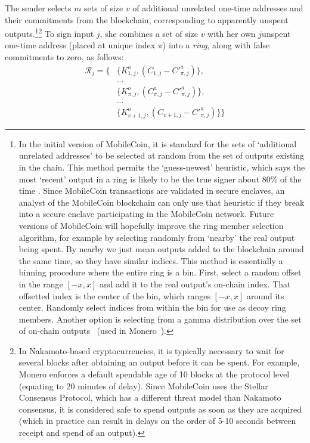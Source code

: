 The sender selects $m$ sets of size $v$ of additional unrelated one-time addresses and their commitments from the blockchain, corresponding to apparently unspent outputs.\footnote{\label{input-selection}In the initial version of MobileCoin, it is standard for the sets of `additional unrelated addresses' to be selected at random from the set of outputs existing in the chain. This method permits the `guess-newest' heuristic, which says the most `recent' output in a ring is likely to be the true signer about 80\% of the time \cite{AnalysisOfLinkability}. Since MobileCoin transactions are validated in secure enclaves, an analyst of the MobileCoin blockchain can only use that heuristic if they break into a secure enclave participating in the MobileCoin network. Future versions of MobileCoin will hopefully improve the ring member selection algorithm, for example by selecting randomly from `nearby' the real output being spent. By nearby we just mean outputs added to the blockchain around the same time, so they have similar indices. This method is essentially a binning procedure where the entire ring is a bin. First, select a random offset in the range $[-x, x]$ and add it to the real output's on-chain index. That offsetted index is the center of the bin, which ranges $[-x, x]$ around its center. Randomly select indices from within the bin for use as decoy ring members. Another option is selecting from a gamma distribution over the set of on-chain outputs~\cite{AnalysisOfLinkability} (used in Monero~\cite{ztm-2}).}\footnote{In Nakamoto-based cryptocurrencies, it is typically necessary to wait for several blocks after obtaining an output before it can be spent. For example, Monero enforces a default spendable age of 10 blocks at the protocol level~\cite{ztm-2} (equating to 20 minutes of delay). Since MobileCoin uses the Stellar Consensus Protocol, which has a different threat model than Nakamoto consensus, it is considered safe to spend outputs as soon as they are acquired (which in practice can result in delays on the order of 5-10 seconds between receipt and spend of an output).} To sign input $j$, she combines a set of size $v$ with her own $j$\nth unspent one-time address (placed at unique index $\pi$) into a {\em ring}, along with false commitments to zero, as follows:\vspace{.175cm}
\begin{align*}
    \mathcal{R}_j = \{&\{K^o_{1, j}, (C_{1, j} - C'^a_{\pi, j})\}, \\
    &... \\
    &\{ K^o_{\pi, j}, (C^a_{\pi, j} - C'^a_{\pi, j})\}, \\
    &... \\
    &\{ K^o_{v+1, j}, (C_{v+1, j} - C'^a_{\pi, j})\}\}
\end{align*}


